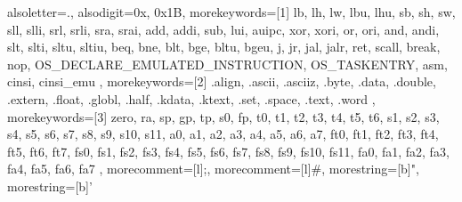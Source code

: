 % 
%
%

{
  alsoletter={.}, %
  alsodigit={0x, 0x1B}, %
  morekeywords=[1]{ %
    lb, lh, lw, lbu, lhu,
    sb, sh, sw,
    sll, slli, srl, srli, sra, srai,
    add, addi, sub, lui, auipc,
    xor, xori, or, ori, and, andi,
    slt, slti, sltu, sltiu,
    beq, bne, blt, bge, bltu, bgeu,
    j, jr, jal, jalr, ret,
    scall, break, nop, OS_DECLARE_EMULATED_INSTRUCTION, OS_TASKENTRY, asm, cinsi, cinsi_emu
  },
  morekeywords=[2]{ %
    .align, .ascii, .asciiz, .byte, .data, .double, .extern,
    .float, .globl, .half, .kdata, .ktext, .set, .space, .text, .word
  },
  morekeywords=[3]{ %
    zero, ra, sp, gp, tp, s0, fp,
    t0, t1, t2, t3, t4, t5, t6,
    s1, s2, s3, s4, s5, s6, s7, s8, s9, s10, s11,
    a0, a1, a2, a3, a4, a5, a6, a7,
    ft0, ft1, ft2, ft3, ft4, ft5, ft6, ft7,
    fs0, fs1, fs2, fs3, fs4, fs5, fs6, fs7, fs8, fs9, fs10, fs11,
    fa0, fa1, fa2, fa3, fa4, fa5, fa6, fa7
  },
  morecomment=[l]{;},   %
  morecomment=[l]{\#},  %
  morestring=[b]",      %
  morestring=[b]'       %
}








